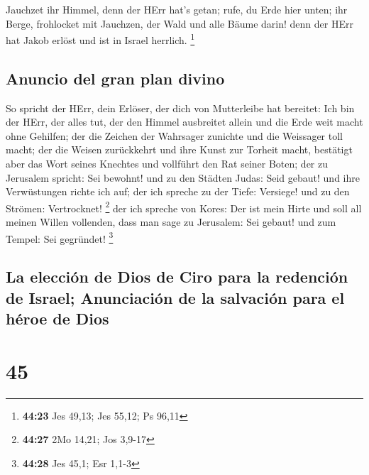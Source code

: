  Jauchzet ihr Himmel, denn der HErr hat's getan; rufe, du
Erde hier unten; ihr Berge, frohlocket mit Jauchzen, der Wald und alle
Bäume darin! denn der HErr hat Jakob erlöst und ist in Israel herrlich.
\footnote{\textbf{44:23} Jes 49,13; Jes 55,12; Ps 96,11}

\hypertarget{anuncio-del-gran-plan-divino}{%
\subsection{Anuncio del gran plan
divino}\label{anuncio-del-gran-plan-divino}}

 So spricht der HErr, dein Erlöser, der dich von
Mutterleibe hat bereitet: Ich bin der HErr, der alles tut, der den
Himmel ausbreitet allein und die Erde weit macht ohne Gehilfen;
 der die Zeichen der Wahrsager zunichte und die Weissager
toll macht; der die Weisen zurückkehrt und ihre Kunst zur Torheit macht,
 bestätigt aber das Wort seines Knechtes und vollführt
den Rat seiner Boten; der zu Jerusalem spricht: Sei bewohnt! und zu den
Städten Judas: Seid gebaut! und ihre Verwüstungen richte ich auf;
 der ich spreche zu der Tiefe: Versiege! und zu den
Strömen: Vertrocknet! \footnote{\textbf{44:27} 2Mo 14,21; Jos 3,9-17}
 der ich spreche von Kores: Der ist mein Hirte und soll
all meinen Willen vollenden, dass man sage zu Jerusalem: Sei gebaut! und
zum Tempel: Sei gegründet! \footnote{\textbf{44:28} Jes 45,1; Esr 1,1-3}

\hypertarget{la-elecciuxf3n-de-dios-de-ciro-para-la-redenciuxf3n-de-israel-anunciaciuxf3n-de-la-salvaciuxf3n-para-el-huxe9roe-de-dios}{%
\subsection{La elección de Dios de Ciro para la redención de Israel;
Anunciación de la salvación para el héroe de
Dios}\label{la-elecciuxf3n-de-dios-de-ciro-para-la-redenciuxf3n-de-israel-anunciaciuxf3n-de-la-salvaciuxf3n-para-el-huxe9roe-de-dios}}

\hypertarget{section-44}{%
\section{45}\label{section-44}}

